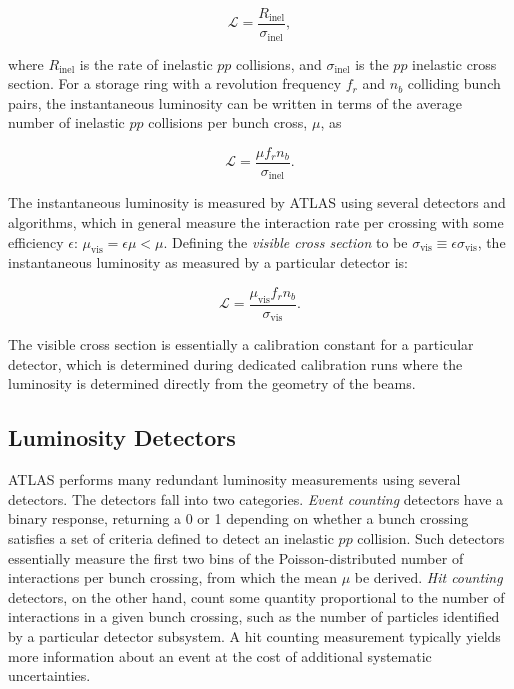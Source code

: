 \begin{equation}
	\mathcal{L} = \frac{R_{\mathrm{inel}}}{\sigma_{\mathrm{inel}}},
\end{equation}

where $R_{\mathrm{inel}}$ is the rate of inelastic $pp$ collisions, and $\sigma_{\mathrm{inel}}$ is the $pp$ inelastic cross section. For a storage ring with a revolution frequency $f_r$ and $n_b$ colliding bunch pairs, the instantaneous luminosity can be written in terms of the average number of inelastic $pp$ collisions per bunch cross, $\mu$, as 

\begin{equation}
	\mathcal{L} = \frac{\mu f_r n_b}{\sigma_{\mathrm{inel}}}.
\end{equation}

The instantaneous luminosity is measured by ATLAS using several detectors and algorithms, which in general measure the interaction rate per crossing with some efficiency $\epsilon$: $\mu_{\mathrm{vis}} = \epsilon \mu < \mu$. Defining the \emph{visible cross section} to be $\sigma_{\mathrm{vis}}\equiv \epsilon \sigma_{\mathrm{vis}}$, the instantaneous luminosity as measured by a particular detector is:

\begin{equation}\label{eqn:reco-luminosity-detected}
	\mathcal{L} = \frac{\mu_{\mathrm{vis}} f_r n_b}{\sigma_{\mathrm{vis}}}.
\end{equation}

The visible cross section is essentially a calibration constant for a particular detector, which is determined during dedicated calibration runs where the luminosity is determined directly from the geometry of the beams. 

\subsection{Luminosity Detectors}\label{sec:reco-luminosity-detectors}
ATLAS performs many redundant luminosity measurements using several detectors. The detectors fall into two categories. \emph{Event counting} detectors have a binary response, returning a 0 or 1 depending on whether a bunch crossing satisfies a set of criteria defined to detect an inelastic $pp$ collision. Such detectors essentially measure the first two bins of the Poisson-distributed number of interactions per bunch crossing, from which the mean $\mu$ be derived. \emph{Hit counting} detectors, on the other hand, count some quantity proportional to the number of interactions in a given bunch crossing, such as the number of particles identified by a particular detector subsystem. A hit counting measurement typically yields more information about an event at the cost of additional systematic uncertainties.

